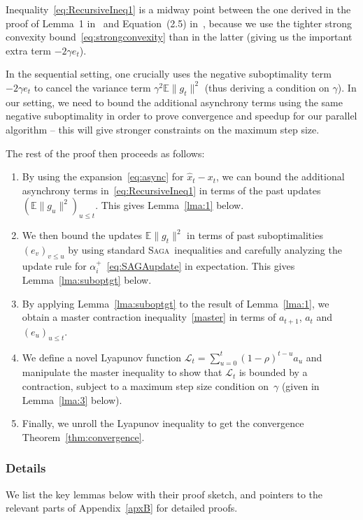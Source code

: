 \documentclass[twoside, 11pt]{article}
\newcommand{\stepsize}{\gamma}
\newcommand{\contraction}{\rho}
\newcommand{\lyapunov}{\mathcal{L}}
\newcommand{\E}{\mathbb{E}}
\newcommand{\SAGA}{\textsc{Saga}}
\begin{document}
Inequality~\eqref{eq:RecursiveIneq1} is a midway point between the one derived in the proof of Lemma~1 in~\citet{qsaga} and Equation~(2.5) in~\citet{mania}, because we use the tighter strong convexity bound~\eqref{eq:strongconvexity} than in the latter (giving us the important extra term $-2\stepsize e_t$).

In the sequential setting, one crucially uses the negative suboptimality term $-2\stepsize e_t$ to cancel the variance term $\stepsize^2 \E \|g_t\|^2$ (thus deriving a condition on $\stepsize$).
In our setting, we need to bound the additional asynchrony terms using the same negative suboptimality in order to prove convergence and speedup for our parallel algorithm -- this will give stronger constraints on the maximum step size.

The rest of the proof then proceeds as follows:
\begin{enumerate}
	\item By using the expansion~\eqref{eq:async} for $\hat{x}_t-x_t$, we can bound the additional asynchrony terms in~\eqref{eq:RecursiveIneq1} in terms of the past updates $(\E \|g_u\|^2)_{u\leq t}$. This gives Lemma~\ref{lma:1} below.
	\item We then bound the updates $\E \|g_t\|^2$ in terms of past suboptimalities $(e_v)_{v\leq u}$ by using standard \SAGA\ inequalities and carefully analyzing the update rule for $\alpha_i^+$~\eqref{eq:SAGAupdate} in expectation. This gives Lemma~\ref{lma:suboptgt} below.
	\item By applying Lemma~\ref{lma:suboptgt} to the result of Lemma~\ref{lma:1}, we obtain a master contraction inequality~\eqref{master} in terms of $a_{t+1}$, $a_t$ and $(e_u)_{u\leq t}$.
	\item We define a novel Lyapunov function $\lyapunov_t = \sum_{u=0}^t (1-\contraction)^{t-u}a_u$ and manipulate the master inequality to show that $\lyapunov_t$ is bounded by a contraction, subject to a maximum step size condition on~$\stepsize$ (given in Lemma~\ref{lma:3} below).
	\item Finally, we unroll the Lyapunov inequality to get the convergence Theorem~\ref{thm:convergence}.
\end{enumerate}

\subsubsection{Details}\label{sec:keylemmas}
We list the key lemmas below with their proof sketch, and pointers to the relevant parts of Appendix~\ref{apxB} for detailed proofs.
\end{document}
